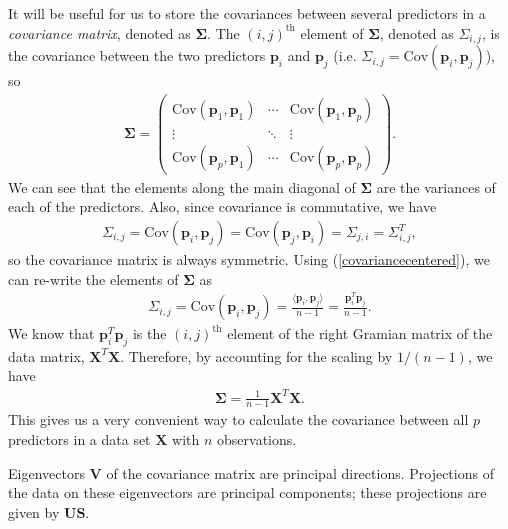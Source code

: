 \documentclass[10pt]{article}
\newcommand{\mydef}[1]{\textcolor{SteelBlue3}{\textit{#1}}} %
\begin{document}
It will be useful for us to store the covariances between several predictors in a \mydef{covariance matrix}, denoted as $\mathbf{\Sigma}$. The $(i,j)^{\text{th}}$ element of $\mathbf{\Sigma}$, denoted as $\Sigma_{i,j}$, is the covariance between the two predictors $\mathbf{p}_i$ and $\mathbf{p}_j$ (i.e. $\Sigma_{i,j} = \mathrm{Cov}(\mathbf{p}_i, \mathbf{p}_j)$), so
\begin{align}
    \label{covariancematrix}
    \mathbf{\Sigma} = \begin{pmatrix}
        \mathrm{Cov}(\mathbf{p}_1, \mathbf{p}_1) & \cdots & \mathrm{Cov}(\mathbf{p}_1, \mathbf{p}_p) \\
        \vdots & \ddots & \vdots \\
        \mathrm{Cov}(\mathbf{p}_p, \mathbf{p}_1) & \cdots & \mathrm{Cov}(\mathbf{p}_p, \mathbf{p}_p)
    \end{pmatrix}.
\end{align}
We can see that the elements along the main diagonal of $\mathbf{\Sigma}$ are the variances of each of the predictors. Also, since covariance is commutative, we have 
\begin{align*}
    \Sigma_{i,j} = \mathrm{Cov}(\mathbf{p}_i, \mathbf{p}_j) = \mathrm{Cov}(\mathbf{p}_j, \mathbf{p}_i) = \Sigma_{j,i} = \Sigma_{i,j}^T,
\end{align*}
so the covariance matrix is always symmetric. Using (\ref{covariancecentered}), we can re-write the elements of $\mathbf{\Sigma}$ as 
\begin{align*}
    \Sigma_{i,j} = \mathrm{Cov}(\mathbf{p}_i, \mathbf{p}_j) = \frac{\langle \mathbf{p}_i, \mathbf{p}_j \rangle}{n-1} = \frac{\mathbf{p}_i^T\mathbf{p}_j}{n-1}.
\end{align*}
We know that $\mathbf{p}_i^T \mathbf{p}_j$ is the $(i,j)^{\text{th}}$ element of the right Gramian matrix of the data matrix, $\mathbf{X}^T \mathbf{X}$. Therefore, by accounting for the scaling by $1/(n-1)$, we have 
\begin{align}
    \label{covarianceasgramian}
    \mathbf{\Sigma} = \frac{1}{n-1} \mathbf{X}^T \mathbf{X}.
\end{align}
This gives us a very convenient way to calculate the covariance between all $p$ predictors in a data set $\mathbf{X}$ with $n$ observations. 

Eigenvectors $\mathbf{V}$ of the covariance matrix are principal directions. Projections of the data on these eigenvectors are principal components; these projections are given by $\mathbf{US}$.
\end{document}
